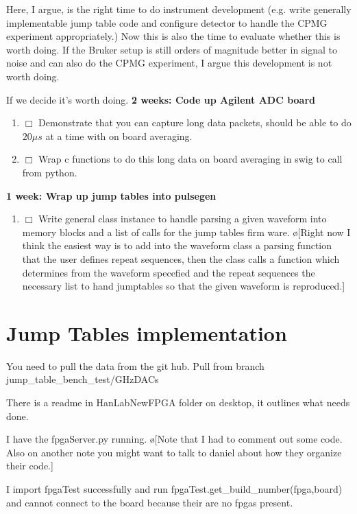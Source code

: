 \documentclass[10pt]{book}
\begin{document}
{Here, I argue, is the right time to do instrument development (e.g. write generally implementable jump table code and configure detector to handle the CPMG experiment appropriately.) Now this is also the time to evaluate whether this is worth doing. If the Bruker setup is still orders of magnitude better in signal to noise and can also do the CPMG experiment, I argue this development is not worth doing.

If we decide it's worth doing.
{\bf 2 weeks: Code up Agilent ADC board}
\begin{enumerate}
    \item $\Box$ Demonstrate that you can capture long data packets, should be able to do $20 \mu s$ at a time with on board averaging.
    \item $\Box$ Wrap c functions to do this long data on board averaging in swig to call from python.\\
\end{enumerate}

{\bf 1 week: Wrap up jump tables into pulsegen}
\begin{enumerate}
    \item $\Box$ Write general class instance to handle parsing a given waveform into memory blocks and a list of calls for the jump tables firm ware. \o[Right now I think the easiest way is to add into the waveform class a parsing function that the user defines repeat sequences, then the class calls a function which determines from the waveform specefied and the repeat sequences the necessary list to hand jumptables so that the given waveform is reproduced.]{}\\
\end{enumerate}

\section{Jump Tables implementation}
You need to pull the data from the git hub. Pull from branch jump\_table\_bench\_test/GHzDACs

There is a readme in HanLabNewFPGA folder on desktop, it outlines what needs done.

I have the fpgaServer.py running. \o[Note that I had to comment out some code. Also on another note you might want to talk to daniel about how they organize their code.]{}

I import fpgaTest successfully and run fpgaTest.get\_build\_number(fpga,board) and cannot connect to the board because their are no fpgas present.

}
\end{document}
